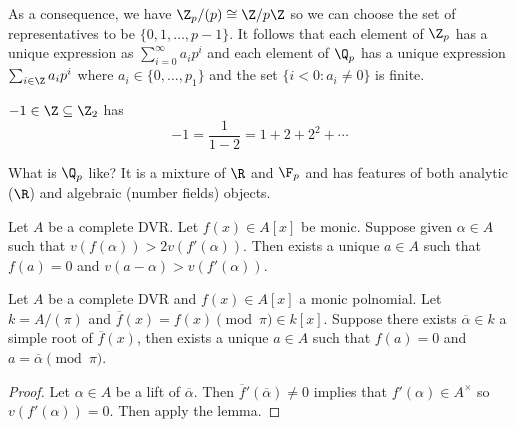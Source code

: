 \documentclass[a4paper]{article}
\begin{document}
As a consequence, we have \(\Z_p/(p) \cong \Z/p\Z\) so we can choose the set of representatives to be \(\{0, 1, \dots, p- 1\}\). It follows that each element of \(\Z_p\) has a unique expression as \(\sum_{i = 0}^\infty a_i p^i\) and each element of \(\Q_p\) has a unique expression \(\sum_{i \in \Z} a_i p^i\) where \(a_i \in \{0, \dots, p_1\}\) and the set \(\{i < 0: a_i \neq 0\}\) is finite.

\begin{eg}
  \(-1 \in \Z \subseteq \Z_2\) has
  \[
    -1 = \frac{1}{1 - 2} = 1 + 2 + 2^2 + \cdots
  \]
\end{eg}

What is \(\Q_p\) like? It is a mixture of \(\R\) and \(\F_p\) and has features of both analytic (\(\R\)) and algebraic (number fields) objects.

\begin{lemma}
  \label{lem:Hensel's lemma}
  Let \(A\) be a complete DVR. Let \(f(x) \in A[x]\) be monic. Suppose given \(\alpha \in A\) such that \(v(f(\alpha)) > 2v(f'(\alpha))\). Then exists a unique \(a \in A\) such that \(f(a) = 0\) and \(v(a - \alpha) > v(f'(\alpha))\).
\end{lemma}

\begin{corollary}
  Let \(A\) be a complete DVR and \(f(x) \in A[x]\) a monic polnomial. Let \(k = A/(\pi)\) and \(\overline f(x) = f(x) \pmod \pi \in k[x]\). Suppose there exists \(\overline \alpha \in k\) a simple root of \(\overline f(x)\), then exists a unique \(a \in A\) such that \(f(a) = 0\) and \(a = \overline \alpha \pmod \pi\).
\end{corollary}

\begin{proof}
  Let \(\alpha \in A\) be a lift of \(\overline \alpha\). Then \(\overline f'(\overline \alpha) \neq 0\) implies that \(f'(\alpha) \in A^\times\) so \(v(f'(\alpha)) = 0\). Then apply the lemma.
\end{proof}
\end{document}
